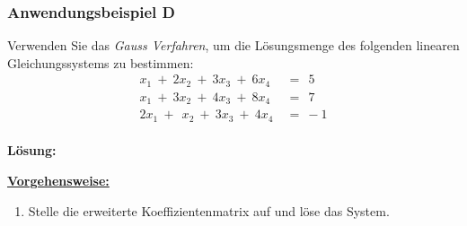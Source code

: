 \subsubsection*{Anwendungsbeispiel D}
Verwenden Sie das \textit{Gauss Verfahren}, um die Lösungsmenge des folgenden linearen Gleichungssystems zu bestimmen:
\begin{equation*}
\begin{split}
x_1 \ + \ 2 x_2 \ + \ 3 x_3 \ + \ 6 x_4 \ &= \ \ 5 \\
x_1 \ + \ 3 x_2 \ + \ 4 x_3 \ + \ 8 x_4 \ &= \ \ 7 \\
2 x_1 \ + \ \ x_2 \ + \ 3 x_3 \ + \ 4 x_4 \ &= \ -1
\end{split}
\end{equation*}
\\
\textbf{Lösung:}
\begin{mdframed}
\underline{\textbf{Vorgehensweise:}}
\renewcommand{\labelenumi}{\theenumi.}
\begin{enumerate}
\item Stelle die erweiterte Koeffizientenmatrix auf und löse das System.
\end{enumerate}
\end{mdframed}



